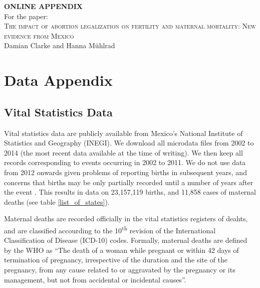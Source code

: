 \documentclass[a4paper, 11pt]{article}
\begin{document}
\begin{spacing}{1.4}
  \begin{center}
    \textbf{ONLINE APPENDIX} \\
    \vspace{4mm}
    For the paper: \\
    \vspace{6mm}
           {\large \textsc{The impact of abortion legalization on fertility and maternal
               mortality: New evidence from Mexico}} \\
    \vspace{3mm}
    Damian Clarke and Hanna M\"uhlrad
\end{center}

\tableofcontents
\setlength\parindent{0.25in}
\setlength\parskip{0.25in}

\renewcommand{\theequation}{A\arabic{equation}}
\newpage

\section{Data Appendix}
\subsection{Vital Statistics Data}
Vital statistics data are publicly available from Mexico's National Institute of
Statistics and Geography (INEGI).  We download all microdata files from 2002 to 2014
(the most recent data available at the time of writing).  We then keep all records
corresponding to events occurring in 2002 to 2011.  We do not use data from 2012 onwards
given problems of reporting births in subsequent years, and concerns that births may be
only partially recorded until a number of years after the event \citep{CONAPO2012}. This
results in data on 23,157,119 births, and 11,858 cases of maternal deaths (see table
\ref{list_of_states}).

Maternal deaths are recorded officially in the vital statistics registers of deahts, and
are classified accourding to the 10\textsuperscript{th} revision of the International
Classification of Disease (ICD-10) codes.  Formally, maternal deaths are defined by the
WHO as ``The death of a woman while pregnant or within 42 days of termination of
pregnancy, irrespective of the duration and the site of the pregnancy, from any cause
related to or aggravated by the pregnancy or its management, but not from accidental or
incidental causes''.


\end{spacing}
\end{document}
